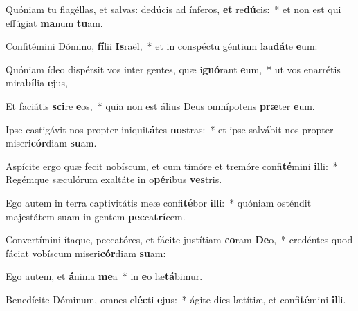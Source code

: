 \item Quóniam tu flagéllas, et salvas: dedúcis ad ínferos, \textbf{et} re\textbf{dú}cis:~* et non est qui effúgiat \textbf{ma}num \textbf{tu}am.
\item Confitémini Dómino, \textbf{fí}lii \textbf{Is}raël,~* et in conspéctu géntium lau\textbf{dá}te \textbf{e}um:
\item Quóniam ídeo dispérsit vos inter gentes, quæ i\textbf{gnó}rant \textbf{e}um,~* ut vos enarrétis mira\textbf{bí}lia \textbf{e}jus,
\item Et faciátis \textbf{sci}re \textbf{e}os,~* quia non est álius Deus omnípotens \textbf{præ}ter \textbf{e}um.
\item Ipse castigávit nos propter iniqui\textbf{tá}tes \textbf{nos}tras:~* et ipse salvábit nos propter miseri\textbf{cór}diam \textbf{su}am.
\item Aspícite ergo quæ fecit nobíscum, et cum timóre et tremóre confi\textbf{té}mini \textbf{il}li:~* Regémque sæculórum exaltáte in o\textbf{pé}ribus \textbf{ves}tris.
\item Ego autem in terra captivitátis meæ confi\textbf{té}bor \textbf{il}li:~* quóniam osténdit majestátem suam in gentem \textbf{pec}ca\textbf{trí}cem.
\item Convertímini ítaque, peccatóres, et fácite justítiam \textbf{co}ram \textbf{De}o,~* credéntes quod fáciat vobíscum miseri\textbf{cór}diam \textbf{su}am:
\item Ego autem, et \textbf{á}nima \textbf{me}a~* in \textbf{e}o læ\textbf{tá}bimur.
\item Benedícite Dóminum, omnes e\textbf{léc}ti \textbf{e}jus:~* ágite dies lætítiæ, et confi\textbf{té}mini \textbf{il}li.
